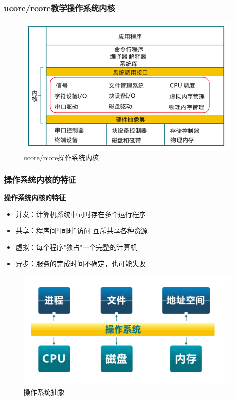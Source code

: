 \documentclass[UTF8]{ctexbeamer}
\begin{document}
\begin{frame}
	\frametitle{ucore/rcore教学操作系统内核}
	\begin{figure}
		\centering
		\includegraphics[width=0.8\linewidth]{ucore-arch}
		\caption{ucore/rcore操作系统内核}
	\end{figure}
\end{frame}



\begin{frame}
	\frametitle{操作系统内核的特征}
	\textbf{操作系统内核的特征}
	\begin{itemize}
		\item 并发：计算机系统中同时存在多个运行程序
		\item 共享：程序间“同时”访问 互斥共享各种资源
		\item 虚拟：每个程序"独占"一个完整的计算机
		\item 异步：服务的完成时间不确定，也可能失败
	\end{itemize}
	\begin{figure}
	\centering
	\includegraphics[width=0.6\linewidth]{os-abstract}
	\caption{操作系统抽象}
\end{figure}
\end{frame}
\end{document}
